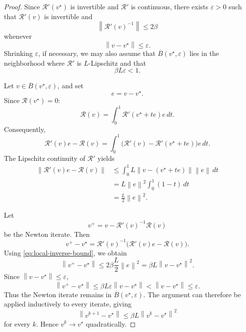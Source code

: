 \documentclass[a4paper,11pt]{book}
\theoremstyle{plain}
\theoremstyle{definition}
\theoremstyle{remark}
\numberwithin{equation}{chapter}
\numberwithin{algorithm}{chapter}
\newcommand{\norm}[1]{\left\|#1\right\|}
\begin{document}
	\begin{proof}
		Since \(\mathcal R'(v^\star)\) is invertible and \(\mathcal R'\) is
		continuous, there exists \(\varepsilon>0\) such that
		\(\mathcal R'(v)\) is invertible and
		\begin{equation}
			\norm{\mathcal R'(v)^{-1}}\leq2\beta
			\label{eq:local-inverse-bound}
		\end{equation}
		whenever
		\[
		\norm{v-v^\star}\leq\varepsilon.
		\]
		Shrinking \(\varepsilon\), if necessary, we may also assume that
		\(\overline B(v^\star,\varepsilon)\) lies in the neighborhood where
		\(\mathcal R'\) is \(L\)-Lipschitz and that
		\[
		\beta L\varepsilon<1.
		\]
		
		Let \(v\in\overline B(v^\star,\varepsilon)\), and set
		\[
		e=v-v^\star.
		\]
		Since \(\mathcal R(v^\star)=0\):
		\[
		\mathcal R(v)
		=
		\int_0^1
		\mathcal R'(v^\star+te)e\,dt.
		\]
		Consequently,
		\[
		\mathcal R'(v)e-\mathcal R(v)
		=
		\int_0^1
		\bigl(
		\mathcal R'(v)-\mathcal R'(v^\star+te)
		\bigr)e\,dt.
		\]
		The Lipschitz continuity of \(\mathcal R'\) yields
		\begin{align}
			\norm{\mathcal R'(v)e-\mathcal R(v)}
			&\leq
			\int_0^1
			L\norm{v-(v^\star+te)}\norm{e}\,dt\\
			&=
			L\norm{e}^2\int_0^1(1-t)\,dt\\
			&=
			\frac{L}{2}\norm{e}^2.
		\end{align}
		
		Let
		\[
		v^+
		=
		v-\mathcal R'(v)^{-1}\mathcal R(v)
		\]
		be the Newton iterate. Then
		\[
		v^+-v^\star
		=
		\mathcal R'(v)^{-1}
		\bigl(
		\mathcal R'(v)e-\mathcal R(v)
		\bigr).
		\]
		Using \eqref{eq:local-inverse-bound}, we obtain
		\[
		\norm{v^+-v^\star}
		\leq
		2\beta\frac{L}{2}\norm{e}^2
		=
		\beta L\norm{v-v^\star}^2.
		\]
		Since \(\norm{v-v^\star}\leq\varepsilon\),
		\[
		\norm{v^+-v^\star}
		\leq
		\beta L\varepsilon\norm{v-v^\star}
		<
		\norm{v-v^\star}
		\leq
		\varepsilon.
		\]
		Thus the Newton iterate remains in
		\(\overline B(v^\star,\varepsilon)\). The argument can therefore be applied
		inductively to every iterate, giving
		\[
		\norm{v^{k+1}-v^\star}
		\leq
		\beta L\norm{v^k-v^\star}^2
		\]
		for every \(k\). Hence \(v^k\to v^\star\) quadratically.
	\end{proof}
\end{document}
